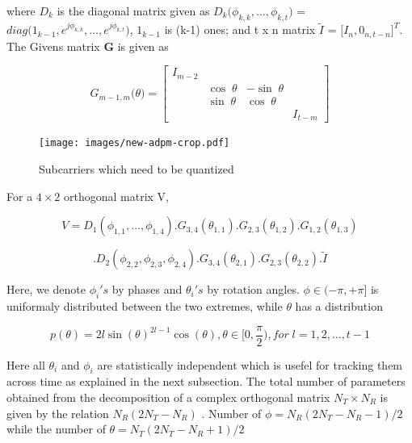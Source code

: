 \documentclass[conference]{IEEEtran}
\begin{document}
where $D_{k}$ is the diagonal matrix given as $D_{k}\big(\phi_{k,k}, \ldots, \phi_{k,t} \big)$ =  $diag\big( 1_{k-1}, e^{j\phi_{k,k}},\ldots, e^{j\phi_{k,t}}  \big)$, $1_{k-1}$ is (k-1) ones; and t x n matrix $\tilde{I}$ = $\big[I_{n}, 0_{n,t-n}\big]^{T}$. The Givens matrix \textbf{G} is given as 

\begin{equation} 
G_{m-1,m}\big(\theta\big)  = 
\begin{bmatrix}

I_{m-2} & & & \\ 
& \cos\;\theta & - \sin\;\theta & \\ 
& \sin\;\theta & \cos\;\theta & \\ 
& & & I_{t-m}

\end{bmatrix} 
\end{equation} 
  

\begin{figure} 
\texttt{[image: images/new-adpm-crop.pdf]} 
\caption{Subcarriers which need to be quantized} 
\label{ber_overvie}
\vspace{-5pt} 
\end{figure} 


For a $4 \times 2$ orthogonal matrix V, 

$$V = D_{1}(\phi_{1,1},\ldots,\phi_{1,4}).G_{3,4}(\theta_{1,1}) .G_{2,3}(\theta_{1,2}) .G_{1,2}(\theta_{1,3})$$ 

\vspace{-1.4em} 

\hspace{1pt}$$.D_{2}(\phi_{2,2},\phi_{2,3},\phi_{2,4}) .G_{3,4}(\theta_{2,1}) .G_{2,3}(\theta_{2,2}).\tilde{I}$$ 

  

Here, we denote $\phi_{i}'s$ by phases and $\theta_{i}'s$ by rotation angles. $\phi \in (-\pi, + \pi]$ is uniformaly distributed between the two extremes\cite{4114278}, while $\theta$ has a distribution 

\begin{equation} 
p(\theta) = 2l\sin(\theta)^{2l-1}\cos(\theta), \theta \in [0, \frac{\pi}{2}), for \; l = 1,2,\ldots,t-1
\end{equation}

Here all $\theta_i$ and $\phi_i$ are statistically independent which is usefel for tracking them across time as explained in the next subsection. The total number of parameters obtained from the decomposition of a complex orthogonal matrix $N_{T} \times N_{R} $ is given by the relation $N_{R}(2N_{T} - N_{R}) $ \cite{4114278}. Number of $\phi = N_{R}(2N_{T} - N_{R}-1)/2$ while the number of $\theta = N_{T}(2N_{T} - N_{R}+1)/2$ 
\end{document}
